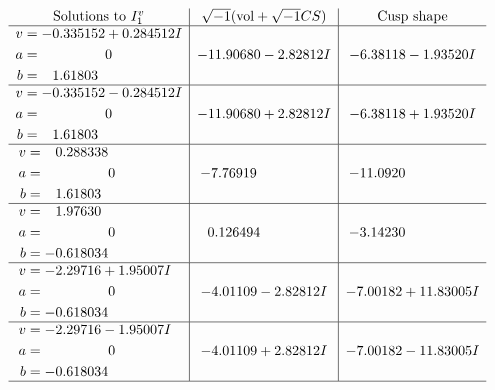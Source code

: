 \documentclass[1p]{elsarticle_modified}
\theoremstyle{definition}
\newcommand{\I}{\sqrt{-1}}
\begin{document}
$$\begin{array}{c|c|c}  
\text{Solutions to }I^v_{1}& \I (\text{vol} + \sqrt{-1}CS) & \text{Cusp shape}\\
 \hline 
\begin{aligned}
v &= -0.335152 + 0.284512 I \\
a &= \phantom{-0.000000 } 0 \\
b &= \phantom{-}1.61803\phantom{ +0.000000I}\end{aligned}
 & -11.90680 - 2.82812 I & -6.38118 - 1.93520 I \\ \hline\begin{aligned}
v &= -0.335152 - 0.284512 I \\
a &= \phantom{-0.000000 } 0 \\
b &= \phantom{-}1.61803\phantom{ +0.000000I}\end{aligned}
 & -11.90680 + 2.82812 I & -6.38118 + 1.93520 I \\ \hline\begin{aligned}
v &= \phantom{-}0.288338\phantom{ +0.000000I} \\
a &= \phantom{-0.000000 } 0 \\
b &= \phantom{-}1.61803\phantom{ +0.000000I}\end{aligned}
 & -7.76919\phantom{ +0.000000I} & -11.0920\phantom{ +0.000000I} \\ \hline\begin{aligned}
v &= \phantom{-}1.97630\phantom{ +0.000000I} \\
a &= \phantom{-0.000000 } 0 \\
b &= -0.618034\phantom{ +0.000000I}\end{aligned}
 & \phantom{-}0.126494\phantom{ +0.000000I} & -3.14230\phantom{ +0.000000I} \\ \hline\begin{aligned}
v &= -2.29716 + 1.95007 I \\
a &= \phantom{-0.000000 } 0 \\
b &= -0.618034\phantom{ +0.000000I}\end{aligned}
 & -4.01109 - 2.82812 I & -7.00182 + 11.83005 I \\ \hline\begin{aligned}
v &= -2.29716 - 1.95007 I \\
a &= \phantom{-0.000000 } 0 \\
b &= -0.618034\phantom{ +0.000000I}\end{aligned}
 & -4.01109 + 2.82812 I & -7.00182 - 11.83005 I\\
 \hline 
 \end{array}$$\newpage
\end{document}
